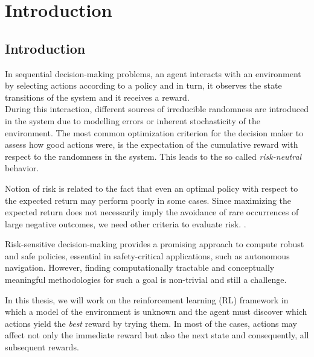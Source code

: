 \chapter{Introduction}
\label{sec:introduction}


\section{Introduction}
In sequential decision-making problems, an agent interacts with an environment by
selecting actions according to a policy 
and in turn, it observes the state transitions of the system and it receives a reward.\\
During this interaction, different sources of irreducible 
randomness are introduced in the system due to modelling errors or inherent stochasticity of the environment.
The most common optimization criterion for the decision maker to assess how good actions were, 
is the expectation of the cumulative reward
with respect to the randomness in the system. This leads to the so called \textit{risk-neutral} behavior.

Notion of risk is related to the fact that even an optimal policy with respect to the 
expected return may perform poorly in some cases.
Since maximizing the expected return does not necessarily imply the avoidance
of rare occurrences of large negative outcomes,
we need other criteria to evaluate risk. \citep{Garcia2015}.

Risk-sensitive decision-making provides a promising
approach to compute robust and safe policies, essential in safety-critical applications,
such as autonomous navigation.
However, finding computationally tractable and conceptually meaningful methodologies for
such a goal is non-trivial and still a challenge.

In this thesis, we will work on the reinforcement learning (RL)
framework in which a model of the environment is unknown and the agent
must discover which actions yield the \textit{best} reward by trying them. 
In most of the cases,
actions may affect not only the immediate reward but also the next state and consequently,
all subsequent rewards.

